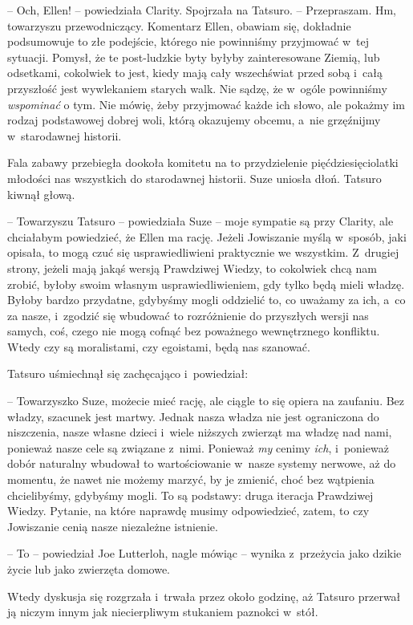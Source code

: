 \documentclass[oneside,polish,11pt,sfheadings]{mwbk}
\begin{document}
-- Och, Ellen! -- powiedziała Clarity. Spojrzała na Tatsuro. -- Przepraszam. Hm, towarzyszu przewodniczący. Komentarz Ellen, obawiam
się, dokładnie podsumowuje to złe podejście, którego nie powinniśmy
przyjmować w~tej sytuacji. Pomysł, że te post-ludzkie byty byłyby
zainteresowane Ziemią, lub odsetkami, cokolwiek to jest, kiedy mają cały
wszechświat przed sobą i~całą przyszłość jest wywlekaniem starych walk.
Nie sądzę, że w~ogóle powinniśmy \textit{wspominać }o tym. Nie mówię, żeby
przyjmować każde ich słowo, ale pokażmy im rodzaj podstawowej dobrej
woli, którą okazujemy obcemu, a~nie grzęźnijmy w~starodawnej historii.

Fala zabawy przebiegła dookoła komitetu na to przydzielenie
pięćdziesięciolatki młodości nas wszystkich do starodawnej historii.
Suze uniosła dłoń. Tatsuro kiwnął głową.

-- Towarzyszu Tatsuro -- powiedziała Suze -- moje sympatie są przy
Clarity, ale chciałabym powiedzieć, że Ellen ma rację. Jeżeli Jowiszanie
myślą w~sposób, jaki opisała, to mogą czuć się usprawiedliwieni
praktycznie we wszystkim. Z~drugiej strony, jeżeli mają jakąś wersją
Prawdziwej Wiedzy, to cokolwiek chcą nam zrobić, byłoby swoim własnym
usprawiedliwieniem, gdy tylko będą mieli władzę. Byłoby bardzo
przydatne, gdybyśmy mogli oddzielić to, co uważamy za ich, a~co za
nasze, i~zgodzić się wbudować to rozróżnienie do przyszłych wersji nas
samych, coś, czego nie mogą cofnąć bez poważnego wewnętrznego konfliktu.
Wtedy czy są moralistami, czy egoistami, będą nas szanować.

Tatsuro uśmiechnął się zachęcająco i~powiedział: 

-- Towarzyszko Suze,
możecie mieć rację, ale ciągle to się opiera na zaufaniu. Bez władzy,
szacunek jest martwy. Jednak nasza władza nie jest ograniczona do
niszczenia, nasze własne dzieci i~wiele niższych zwierząt ma władzę nad
nami, ponieważ nasze cele są związane z~nimi. Ponieważ \textit{my} cenimy
\textit{ich}, i~ponieważ dobór naturalny wbudował to wartościowanie w~nasze systemy nerwowe, aż do momentu, że nawet nie możemy marzyć, by je
zmienić, choć bez wątpienia chcielibyśmy, gdybyśmy mogli. To są
podstawy: druga iteracja Prawdziwej Wiedzy. Pytanie, na które naprawdę
musimy odpowiedzieć, zatem, to czy Jowiszanie cenią nasze niezależne
istnienie.

-- To -- powiedział Joe Lutterloh, nagle mówiąc -- wynika z~przeżycia jako
dzikie życie lub jako zwierzęta domowe.

Wtedy dyskusja się rozgrzała i~trwała przez około godzinę, aż Tatsuro
przerwał ją niczym innym jak niecierpliwym stukaniem paznokci w~stół.
\end{document}
